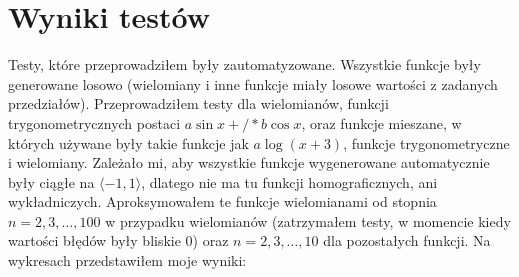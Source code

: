 \documentclass[11pt,wide]{mwart}
\begin{document}
\section{Wyniki testów} \label{wyniki}
Testy, które przeprowadziłem były zautomatyzowane. Wszystkie funkcje były generowane losowo (wielomiany i inne funkcje miały losowe wartości z zadanych przedziałów). Przeprowadziłem testy dla wielomianów, funkcji trygonometrycznych postaci $a \sin x +/* b \cos x$, oraz funkcje mieszane, w których używane były takie funkcje jak $a\log(x+3)$, funkcje trygonometryczne i wielomiany. Zależało mi, aby wszystkie funkcje wygenerowane automatycznie były ciągłe na $\langle -1, 1 \rangle$, dlatego nie ma tu funkcji homograficznych, ani wykładniczych. Aproksymowałem te funkcje wielomianami od stopnia $n = 2, 3, \dots, 100$ w przypadku wielomianów (zatrzymałem testy, w momencie kiedy wartości błędów były bliskie 0) oraz $n = 2,3,\dots, 10$ dla pozostałych funkcji. Na wykresach przedstawiłem moje wyniki:
\end{document}
